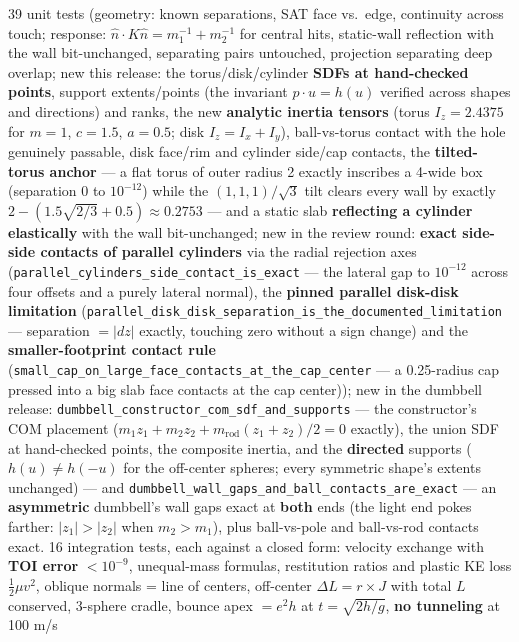 \documentclass[11pt]{article}
\newcommand{\code}[1]{\texttt{#1}}
\begin{document}
39 unit tests (geometry: known separations, SAT face vs.\ edge, continuity
across touch; response: $\hat n \!\cdot\! K \hat n = m_1^{-1}+m_2^{-1}$ for
central hits, static-wall reflection with the wall bit-unchanged, separating
pairs untouched, projection separating deep overlap; new this release: the
torus/disk/cylinder \textbf{SDFs at hand-checked points}, support
extents/points (the invariant $p \cdot u = h(u)$ verified across shapes and
directions) and ranks, the new \textbf{analytic inertia tensors} (torus
$I_z = 2.4375$ for $m = 1$, $c = 1.5$, $a = 0.5$; disk $I_z = I_x + I_y$),
ball-vs-torus contact with the hole genuinely passable, disk face/rim and
cylinder side/cap contacts, the \textbf{tilted-torus anchor} --- a flat
torus of outer radius 2 exactly inscribes a 4-wide box (separation 0 to
$10^{-12}$) while the $(1,1,1)/\sqrt3$ tilt clears every wall by exactly
$2 - (1.5\sqrt{2/3} + 0.5) \approx 0.2753$ --- and a static slab
\textbf{reflecting a cylinder elastically} with the wall bit-unchanged;
new in the review round: \textbf{exact side-side contacts of parallel
cylinders} via the radial rejection axes
(\code{parallel\_cylinders\_side\_contact\_is\_exact} --- the lateral gap
to $10^{-12}$ across four offsets and a purely lateral normal), the
\textbf{pinned parallel disk-disk limitation}
(\code{parallel\_disk\_disk\_separation\_is\_the\_documented\_limitation}
--- separation $= |dz|$ exactly, touching zero without a sign change) and
the \textbf{smaller-footprint contact rule}
(\code{small\_cap\_on\_large\_face\_contacts\_at\_the\_cap\_center} --- a
0.25-radius cap pressed into a big slab face contacts at the cap center));
new in the dumbbell release:
\code{dumbbell\_constructor\_com\_sdf\_and\_supports} --- the constructor's
COM placement ($m_1 z_1 + m_2 z_2 + m_{\mathrm{rod}}(z_1 + z_2)/2 = 0$
exactly), the union SDF at hand-checked points, the composite inertia, and
the \textbf{directed} supports ($h(u) \ne h(-u)$ for the off-center
spheres; every symmetric shape's extents unchanged) --- and
\code{dumbbell\_wall\_gaps\_and\_ball\_contacts\_are\_exact} --- an
\textbf{asymmetric} dumbbell's wall gaps exact at \textbf{both} ends (the
light end pokes farther: $|z_1| > |z_2|$ when $m_2 > m_1$), plus
ball-vs-pole and ball-vs-rod contacts exact.
16 integration tests, each against a closed form: velocity exchange with
\textbf{TOI error} $< 10^{-9}$, unequal-mass formulas, restitution ratios and
plastic KE loss $\tfrac12 \mu v^2$, oblique normals = line of centers,
off-center $\Delta L = r \times J$ with total $L$ conserved, 3-sphere cradle,
bounce apex $= e^2 h$ at $t = \sqrt{2h/g}$, \textbf{no tunneling} at 100 m/s
\end{document}
